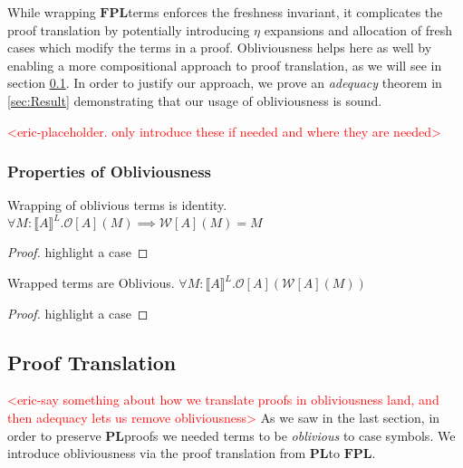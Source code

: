 \documentclass[acmsmall]{acmart}
\newcommand{\den}[1]{\llbracket #1\rrbracket}
\newcommand{\eric}[1]{\textcolor{red}{ <eric-#1> }}
\newcommand{\pl}{$\mathbf{PL}$}
\newcommand{\fpl}{$\mathbf{FPL}$}
\begin{document}
While wrapping \fpl\;terms enforces the freshness invariant, it complicates the proof translation by potentially introducing $\eta$ expansions and allocation of fresh cases which modify the terms in a proof. Obliviousness helps here as well by enabling a more compositional approach to proof translation, as we will see in section \cref{sec:ProofTranslation}. In order to justify our approach, we prove an \textit{adequacy} theorem in \cref{sec:Result} demonstrating that our usage of obliviousness is sound.

\eric{placeholder. only introduce these if needed and where they are needed}
\subsubsection{Properties of Obliviousness}


\begin{theorem} Wrapping of oblivious terms is identity.
 $\forall M : \den{A}^L. \mathcal{O}[A](M) \implies \mathcal{W}[A](M) = M$
\end{theorem}

\begin{proof}
  highlight a case
\end{proof}


\begin{theorem} Wrapped terms are Oblivious.
  $\forall M : \den{A}^L. \mathcal{O}[A](\mathcal{W}[A](M))$
 \end{theorem}
 
 \begin{proof}
   highlight a case
 \end{proof}


\subsection{Proof Translation}\label{sec:ProofTranslation}

\eric{say something about how we translate proofs in obliviousness land, and then adequacy lets us remove obliviousness}
As we saw in the last section, in order to preserve \pl\;proofs we needed terms to be \textit{oblivious} to case symbols. We introduce obliviousness via the proof translation from \pl\;to \fpl. 
\end{document}
